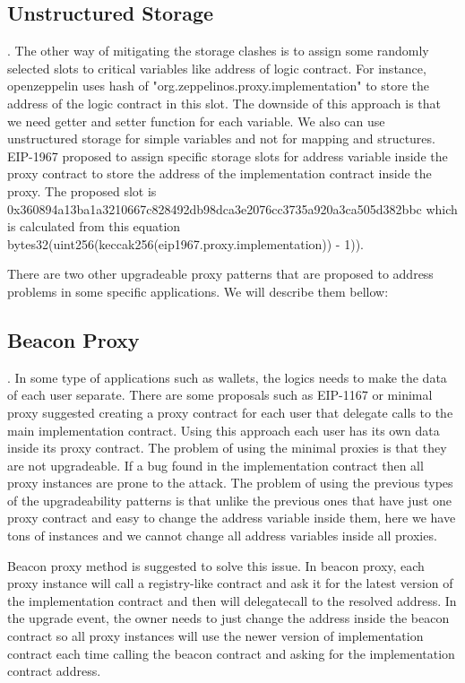 \subsection{Unstructured Storage}. 
The other way of mitigating the storage clashes is to assign some randomly selected slots to critical variables like address of logic contract. For instance, openzeppelin uses hash of "org.zeppelinos.proxy.implementation" to store the address of the logic contract in this slot.
The downside of this approach is that we need getter and setter function for each variable. We also can use unstructured storage for simple variables and not for mapping and structures. EIP-1967 proposed to assign specific storage slots for address variable inside the proxy contract to store the address of the implementation contract inside the proxy. The proposed slot is 0x360894a13ba1a3210667c828492db98dca3e2076cc3735a920a3ca505d382bbc which is calculated from this equation
bytes32(uint256(keccak256(eip1967.proxy.implementation)) - 1)). 

There are two other upgradeable proxy patterns that are proposed to address problems in some specific applications. We will describe them bellow: 

\subsection{Beacon Proxy}. 
In some type of applications such as wallets, the logics needs to make the data of each user separate. There are some proposals such as EIP-1167 or minimal proxy suggested creating a proxy contract for each user that delegate calls to the main implementation contract. Using this approach each user has its own data inside its proxy contract. The problem of using the minimal proxies is that they are not upgradeable. If a bug found in the implementation contract then all proxy instances are prone to the attack. The problem of using the previous types of the upgradeability patterns is that unlike the previous ones that have just one proxy contract and easy to change the address variable inside them, here we have tons of instances and we cannot change all address variables inside all proxies. 

Beacon proxy method is suggested to solve this issue. In beacon proxy, each proxy instance will call a registry-like contract and ask it for the latest version of the implementation contract and then will delegatecall to the resolved address. In the upgrade event, the owner needs to just change the address inside the beacon contract so all proxy instances will use the newer version of implementation contract each time calling the beacon contract and asking for the implementation contract address.


